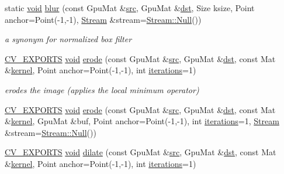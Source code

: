 \begin{DoxyCompactItemize}
\item 
static \hyperlink{legacy_8hpp_a8bb47f092d473522721002c86c13b94e}{void} \hyperlink{namespacecv_1_1gpu_aa62f5846750cf3fc0026eb68e3238ef2}{blur} (const Gpu\-Mat \&\hyperlink{legacy_8hpp_a371cd109b74033bc4366f584edd3dacc}{src}, Gpu\-Mat \&\hyperlink{photo__c_8h_aed13e2a25279b24dc954073233fef7a5}{dst}, Size ksize, Point anchor=Point(-\/1,-\/1), \hyperlink{classcv_1_1gpu_1_1Stream}{Stream} \&stream=\hyperlink{classcv_1_1gpu_1_1Stream_af96c23564834f88333dcb8997df553f1}{Stream\-::\-Null}())
\begin{DoxyCompactList}\small\item\em a synonym for normalized box filter \end{DoxyCompactList}\item 
\hyperlink{core_2types__c_8h_a1bf9f0e121b54272da02379cfccd0a2b}{C\-V\-\_\-\-E\-X\-P\-O\-R\-T\-S} \hyperlink{legacy_8hpp_a8bb47f092d473522721002c86c13b94e}{void} \hyperlink{namespacecv_1_1gpu_acde1fa907eb49b82268dddaad211cf48}{erode} (const Gpu\-Mat \&\hyperlink{legacy_8hpp_a371cd109b74033bc4366f584edd3dacc}{src}, Gpu\-Mat \&\hyperlink{photo__c_8h_aed13e2a25279b24dc954073233fef7a5}{dst}, const Mat \&\hyperlink{imgproc__c_8h_a863a75780ba6c5de552f5361cb0d2c89}{kernel}, Point anchor=Point(-\/1,-\/1), int \hyperlink{tracking_8hpp_a17372ac3c8ba01bc6cfc265b2824992e}{iterations}=1)
\begin{DoxyCompactList}\small\item\em erodes the image (applies the local minimum operator) \end{DoxyCompactList}\item 
\hyperlink{core_2types__c_8h_a1bf9f0e121b54272da02379cfccd0a2b}{C\-V\-\_\-\-E\-X\-P\-O\-R\-T\-S} \hyperlink{legacy_8hpp_a8bb47f092d473522721002c86c13b94e}{void} \hyperlink{namespacecv_1_1gpu_a9ec78906a1c82cfe8c80c083ab3e4d66}{erode} (const Gpu\-Mat \&\hyperlink{legacy_8hpp_a371cd109b74033bc4366f584edd3dacc}{src}, Gpu\-Mat \&\hyperlink{photo__c_8h_aed13e2a25279b24dc954073233fef7a5}{dst}, const Mat \&\hyperlink{imgproc__c_8h_a863a75780ba6c5de552f5361cb0d2c89}{kernel}, Gpu\-Mat \&buf, Point anchor=Point(-\/1,-\/1), int \hyperlink{tracking_8hpp_a17372ac3c8ba01bc6cfc265b2824992e}{iterations}=1, \hyperlink{classcv_1_1gpu_1_1Stream}{Stream} \&stream=\hyperlink{classcv_1_1gpu_1_1Stream_af96c23564834f88333dcb8997df553f1}{Stream\-::\-Null}())
\item 
\hyperlink{core_2types__c_8h_a1bf9f0e121b54272da02379cfccd0a2b}{C\-V\-\_\-\-E\-X\-P\-O\-R\-T\-S} \hyperlink{legacy_8hpp_a8bb47f092d473522721002c86c13b94e}{void} \hyperlink{namespacecv_1_1gpu_ab96dbbbb7c539e8dda64de5a8ad76517}{dilate} (const Gpu\-Mat \&\hyperlink{legacy_8hpp_a371cd109b74033bc4366f584edd3dacc}{src}, Gpu\-Mat \&\hyperlink{photo__c_8h_aed13e2a25279b24dc954073233fef7a5}{dst}, const Mat \&\hyperlink{imgproc__c_8h_a863a75780ba6c5de552f5361cb0d2c89}{kernel}, Point anchor=Point(-\/1,-\/1), int \hyperlink{tracking_8hpp_a17372ac3c8ba01bc6cfc265b2824992e}{iterations}=1)

\end{DoxyCompactItemize}
